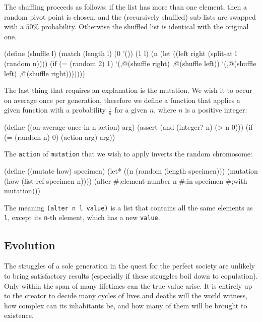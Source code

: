 The shuffling proceeds as follows: if the list has more
than one element, then a random pivot point is chosen,
and the (recursively shuffled) sub-lists are swapped with
a $50\%$ probability. Otherwise the shuffled list is
identical with the original one.

\begin{Snippet}
(define (shuffle l)
  (match (length l)
    (0 '())
    (1 l)
    (n (let ((left right (split-at l (random n))))
	 (if (= (random 2) 1)
	     `(,@(shuffle right) ,@(shuffle left))
	     `(,@(shuffle left) ,@(shuffle right)))))))
\end{Snippet}

The last thing that requires an explanation is the mutation.
We wish it to occur on average once per generation, therefore
we define a function that applies a given function with
a probability $\frac{1}{n}$ for a given $n$, where $n$ is
a positive integer:

\begin{Snippet}
(define ((on-average-once-in n action) arg)
  (assert (and (integer? n) (> n 0)))
  (if (= (random n) 0)
      (action arg)
      arg))
\end{Snippet}

The \texttt{action} of \texttt{mutation} that we wish to apply
inverts the random chromosome:

\begin{Snippet}
(define ((mutate how) specimen)
  (let* ((n (random (length specimen)))
	 (mutation (how (list-ref specimen n))))
    (alter #;element-number n #;in specimen #;with mutation)))
\end{Snippet}

The meaning \texttt{(alter n l value)} is a list that contains
all the same elements as \texttt{l}, except its \texttt{n}-th
element, which has a new \texttt{value}.

\subsection{Evolution}

The struggles of a sole generation in the quest for the perfect
society are unlikely to bring satisfactory results (especially
if these struggles boil down to copulation). Only within
the span of many lifetimes can the true value arise. It is
entirely up to the creator to decide many cycles of lives
and deaths will the world witness, how complex can its inhabitants
be, and how many of them will be brought to existence.

